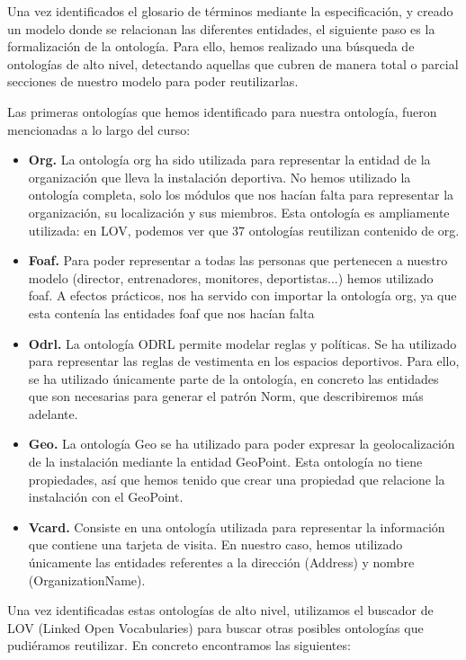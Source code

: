 \documentclass[a4paper,12pt]{article}
\begin{document}
	Una vez identificados el glosario de términos mediante la especificación, y creado un modelo donde se relacionan las diferentes entidades, el siguiente paso es la formalización de la ontología. Para ello, hemos realizado una búsqueda de ontologías de alto nivel, detectando aquellas que cubren de manera total o parcial secciones de nuestro modelo para poder reutilizarlas.
	
	Las primeras ontologías que hemos identificado para nuestra ontología, fueron mencionadas a lo largo del curso:
	\begin{itemize}
		\item \textbf{Org.} La ontología org ha sido utilizada para representar la entidad de la organización que lleva la instalación deportiva. No hemos utilizado la ontología completa, solo los módulos que nos hacían falta para representar la organización, su localización y sus miembros. Esta ontología es ampliamente utilizada: en LOV, podemos ver que 37 ontologías reutilizan contenido de org.
		\item \textbf{Foaf.} Para poder representar a todas las personas que pertenecen a nuestro modelo (director, entrenadores, monitores, deportistas...) hemos utilizado foaf. A efectos prácticos, nos ha servido con importar la ontología org, ya que esta contenía las entidades foaf que nos hacían falta
		\item \textbf{Odrl.} La ontología ODRL permite modelar reglas y políticas. Se ha utilizado para representar las reglas de vestimenta en los espacios deportivos. Para ello, se ha utilizado únicamente parte de la ontología, en concreto las entidades que son necesarias para generar el patrón Norm, que describiremos más adelante.
		\item \textbf{Geo.} La ontología Geo se ha utilizado para poder expresar la geolocalización de la instalación mediante la entidad GeoPoint. Esta ontología no tiene propiedades, así que hemos tenido que crear una propiedad que relacione la instalación con el GeoPoint. 
		\item \textbf{Vcard.} Consiste en una ontología utilizada para representar la información que contiene una tarjeta de visita. En nuestro caso, hemos utilizado únicamente las entidades referentes a la dirección (Address) y nombre (OrganizationName).
		
	\end{itemize}
	Una vez identificadas estas ontologías de alto nivel, utilizamos el buscador de LOV (Linked Open Vocabularies) para buscar otras posibles ontologías que pudiéramos reutilizar. En concreto encontramos las siguientes:
	
\end{document}
